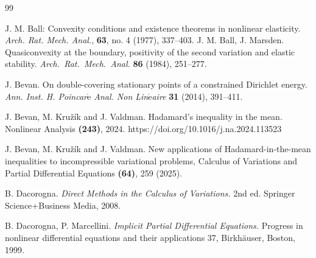 \documentclass[12pt]{amsart}
\newcommand{\1}{{\bf 1}}
\begin{document}
%
\begin{thebibliography}{99}


 J. M. Ball: Convexity conditions and existence theorems in nonlinear elasticity.  {\it Arch. Rat. Mech. Anal.},  {\bf 63}, no. 4 (1977), 337--403.
J. M. Ball, J. Marsden. Quasiconvexity at the boundary, positivity of the second variation and elastic stability. {\it Arch.~Rat.~Mech.~Anal.} {\bf 86} (1984), 251--277. 


J. Bevan.  On double-covering stationary points of a constrained Dirichlet energy. {\it Ann. Inst. H. Poincar$\acute{\textrm{e}}$ Anal. Non Lin$\acute{\textrm{e}}$aire} {\bf 31} (2014),  391--411.


J. Bevan, M. Kru\v{z}\'{i}k and J. Valdman. Hadamard's inequality in the mean.  Nonlinear Analysis {\bf(243)}, 
2024. https://doi.org/10.1016/j.na.2024.113523

J. Bevan, M. Kru\v{z}\'{i}k and J. Valdman. New applications of Hadamard-in-the-mean inequalities to incompressible variational problems, Calculus of Variations and Partial Differential Equations {\bf(64)}, 259 (2025).

 B. Dacorogna. {\it Direct Methods in the Calculus of Variations.} 2nd ed. Springer Science+Business Media, 2008. 

B. Dacorogna, P. Marcellini. {\it Implicit Partial Differential Equations.}  Progress in nonlinear
differential equations and their applications 37, Birkh\"{a}user, Boston, 1999.


\end{thebibliography}
\end{document}

